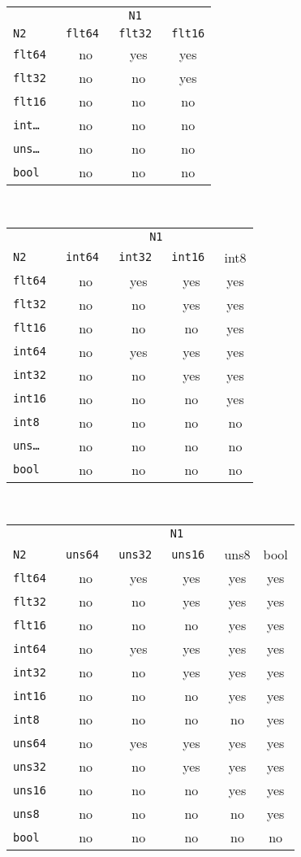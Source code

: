 \documentclass[12pt]{article}
\begin{document}
\begin{center}
\begin{tabular}{l|c|c|c|}
\multicolumn{1}{c}{}	& \multicolumn{3}{c}{\tt N1} \\
\tt N2  & \tt flt64 & \tt flt32 & \tt flt16
\\\hline
\tt flt64 & no & yes & yes \\
\tt flt32 & no & no & yes \\
\tt flt16 & no & no & no
\\\hline
\tt int\ldots{} & no & no & no \\
\tt uns\ldots{} & no & no & no \\
\tt bool & no & no & no
\\\hline
\end{tabular}
\\[2ex]
\begin{tabular}{l|c|c|c|c|}
\multicolumn{1}{c}{}	& \multicolumn{4}{c}{\tt N1} \\
\tt N2  & \tt int64 & \tt int32 & \tt int16 & int8
\\\hline
\tt flt64 & no & yes & yes & yes \\
\tt flt32 & no & no & yes & yes \\
\tt flt16 & no & no & no & yes
\\\hline
\tt int64 & no & yes & yes & yes \\
\tt int32 & no & no & yes & yes \\
\tt int16 & no & no & no & yes \\
\tt int8 & no & no & no & no
\\\hline
\tt uns\ldots{} & no & no & no & no \\
\tt bool & no & no & no & no
\\\hline
\end{tabular}
\\[2ex]
\begin{tabular}{l|c|c|c|c|c|}
\multicolumn{1}{c}{}	& \multicolumn{5}{c}{\tt N1} \\
\tt N2  & \tt uns64 & \tt uns32 & \tt uns16 & uns8 & bool
\\\hline
\tt flt64 & no & yes & yes & yes & yes \\
\tt flt32 & no & no & yes & yes & yes \\
\tt flt16 & no & no & no & yes & yes
\\\hline
\tt int64 & no & yes & yes & yes & yes \\
\tt int32 & no & no & yes & yes & yes \\
\tt int16 & no & no & no & yes & yes \\
\tt int8 & no & no & no & no & yes
\\\hline
\tt uns64 & no & yes & yes & yes & yes \\
\tt uns32 & no & no & yes & yes & yes \\
\tt uns16 & no & no & no & yes & yes \\
\tt uns8 & no & no & no & no & yes
\\\hline
\tt bool & no & no & no & no & no
\\\hline
\end{tabular}
\end{center}
\end{document}
